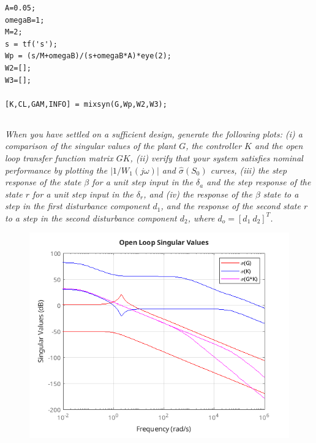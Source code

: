 \documentclass{article}
\begin{document}
\begin{lstlisting}[style=matlabstyle]
A=0.05;
omegaB=1;
M=2;
s = tf('s');
Wp = (s/M+omegaB)/(s+omegaB*A)*eye(2);
W2=[];
W3=[];

[K,CL,GAM,INFO] = mixsyn(G,Wp,W2,W3);    
\end{lstlisting}

\subsection{}
\textit{When you have settled on a sufficient design, generate the following plots: (i) a comparison of the singular values of the plant $G$, the controller $K$ and the open loop transfer function matrix $GK$, (ii) verify that your system satisfies nominal performance by plotting the $|1/W_1(j\omega)|$ and $\hat{\sigma}(S_0)$ curves, (iii) the step response of the state $\beta$ for a unit step input in the $\delta_a$ and the step response of the state $r$ for a unit step input in the $\delta_r$, and (iv) the response of the $\beta$ state to a step in the first disturbance component $d_1$, and the response of the second state $r$ to a step in the second disturbance component $d_2$, where $d_o = [d_1\ d_2]^T$.}

\begin{figure}[H]
    \centering
    \includegraphics[width=\textwidth]{a4GKsigma.png}
\end{figure}
\end{document}
